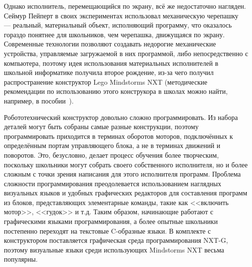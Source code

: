 \documentclass[a4paper]{article}
\begin{document}
Однако исполнитель, перемещающийся по экрану, всё же недостаточно нагляден. Сеймур Пейперт в своих экспериментах использовал механическую черепашку~\cite{logoTurtle} --- реальный, материальный объект, исполняющий программу, что оказалось гораздо понятнее для школьников, чем черепашка, движущаяся по экрану. Современные технологии позволяют создавать недорогие механические устройства, управляемые загружаемой в них программой, либо непосредственно с компьютера, поэтому идея использования материальных исполнителей в школьной информатике получила второе рождение, из-за чего получил распространение конструктор Lego Mindstorms NXT (методические рекомендации по использованию этого конструкора в школах можно найти, например, в пособии~\cite{filippov}). 

Робототехнический конструктор довольно сложно программировать. Из набора деталей могут быть собраны самые разные конструкции, поэтому программировать приходится в терминах оборотов моторов, подключённых к определённым портам управляющего блока, а не в терминах движений и поворотов. Это, безусловно, делает процесс обучения более творческим, поскольку школьники могут собрать своего собственного исполнителя, но и более сложным с точки зрения написания для этого исполнителя программ. Проблема сложности программирования преодолевается использованием наглядных визуальных языков и удобных графических редакторов для составления программ из блоков, представляющих элементарные команды, такие как <<включить мотор>>, <<гудок>> и т.д. Таким образом, начинающие работают с графическими языками программирования, а более опытные школьники постепенно переходят на текстовые C-образные языки. В комплекте с конструктором поставляется графическая среда программирования NXT-G, поэтому визуальные языки среди использующих Mindstorms NXT весьма популярны.
\end{document}

